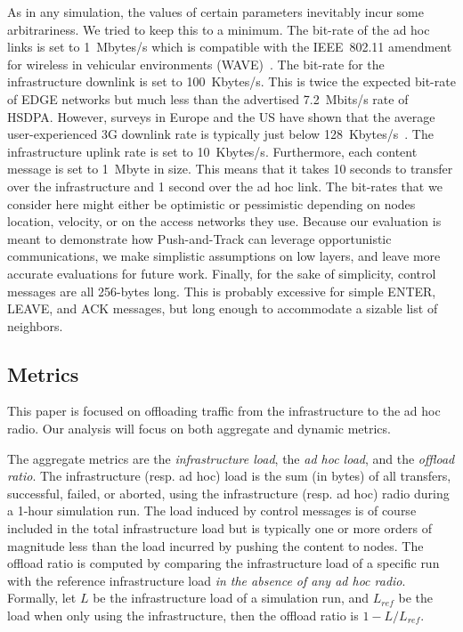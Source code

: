 \documentclass[preprint]{elsarticle}
\begin{document}
As in any simulation, the values of certain parameters inevitably incur some arbitrariness. We tried to keep this to a minimum. The bit-rate of the ad hoc links is set to 1~Mbytes/s which is compatible with the IEEE~802.11 amendment for wireless in vehicular environments (WAVE)~\cite{80211p}. The bit-rate for the infrastructure downlink is set to 100~Kbytes/s. This is twice the expected bit-rate of EDGE networks but much less than the advertised 7.2~Mbits/s rate of HSDPA. However, surveys in Europe and the US have shown that the average user-experienced 3G downlink rate is typically just below 128~Kbytes/s~\cite{wired_3g,ufc_3g}. The infrastructure uplink rate is set to 10~Kbytes/s. Furthermore, each content message is set to 1~Mbyte in size. This means that it takes 10 seconds to transfer over the infrastructure and 1 second over the ad hoc link. The bit-rates that we consider here might either be optimistic or pessimistic depending on nodes location, velocity, or on the access networks they use. Because our evaluation is meant to demonstrate how Push-and-Track can leverage opportunistic communications, we make simplistic assumptions on low layers, and leave more accurate evaluations for future work. Finally, for the sake of simplicity, control messages are all 256-bytes long. This is probably excessive for simple \textsf{ENTER}, \textsf{LEAVE}, and \textsf{ACK} messages, but long enough to accommodate a sizable list of neighbors.

\subsection{Metrics}
\label{subsec:metrics}
This paper is focused on offloading traffic from the infrastructure to the ad hoc radio. Our analysis will focus on both aggregate and dynamic metrics.

The aggregate metrics are the \emph{infrastructure load}, the \emph{ad hoc load}, and the \emph{offload ratio}. The infrastructure (resp. ad hoc) load is the sum (in bytes) of all transfers, successful, failed, or aborted, using the infrastructure (resp. ad hoc) radio during a 1-hour simulation run. The load induced by control messages is of course included in the total infrastructure load but is typically one or more orders of magnitude less than the load incurred by pushing the content to nodes. The offload ratio is computed by comparing the infrastructure load of a specific run with the reference infrastructure load \emph{in the absence of any ad hoc radio}. Formally, let $L$ be the infrastructure load of a simulation run, and $L_{ref}$ be the load when only using the infrastructure, then the offload ratio is $1-L/L_{ref}$.
\end{document}
